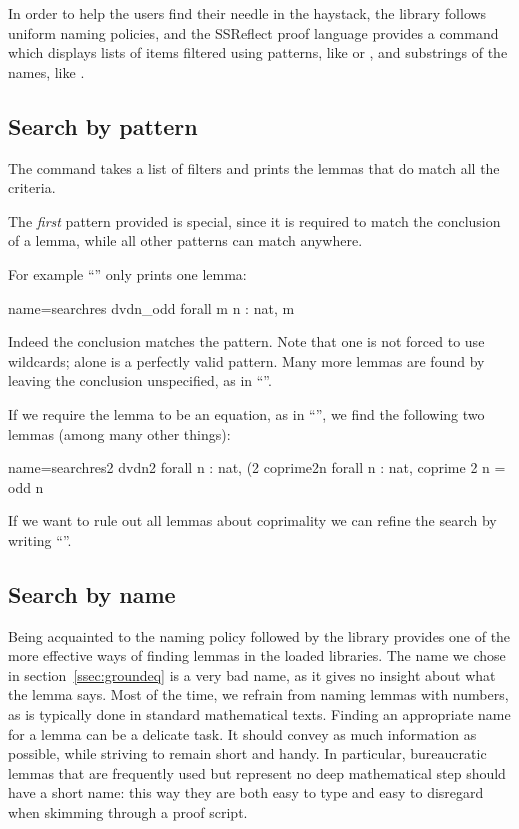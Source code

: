 In order to help the users find their needle in the haystack,
the \mcbMC{} library follows uniform naming policies, and the SSReflect
proof language provides a  command which displays lists of
items filtered using patterns, like \C{(_ * _ + _)}
or , and substrings of the names, like .


\subsection{Search by pattern}

The  command takes a list of filters and prints the lemmas
that do match all the criteria.

The \emph{first} pattern provided is special, since it is required to match
the conclusion of a lemma, while all other patterns can match anywhere.

For example ``'' only prints one lemma:

\begin{coq}{name=searchres}{}
dvdn_odd  forall m n : nat, m %
\end{coq}
Indeed the conclusion matches the pattern.  Note that one is not forced to
use wildcards;  alone is a perfectly valid pattern.  Many more
lemmas are found by leaving the conclusion unspecified,
as in ``''.

If we require the lemma to be an equation, as in ``'', we find
the following two lemmas (among many other things):

\begin{coq}{name=searchres2}{}
dvdn2  forall n : nat, (2 %
coprime2n  forall n : nat, coprime 2 n = odd n
\end{coq}
If we want to rule out all lemmas about coprimality we can refine the
search by writing ``''.

\subsection{Search by name}

Being acquainted to the naming policy followed by the \mcbMC{} library
provides one of the more effective ways of finding lemmas in the
loaded libraries. The name   we chose in
section~\ref{ssec:groundeq} is a very bad name, as it gives no
insight about what the lemma says. Most of the time, we
refrain  from naming lemmas with numbers, as is typically done in
standard mathematical texts. Finding an appropriate name for a
lemma can be a delicate task. It should convey as much information as
possible, while striving to remain short and handy. In particular,
bureaucratic lemmas that are frequently used but represent no deep
mathematical step should have a short name: this way they are both
easy to type and easy to disregard when skimming through a proof
script.

